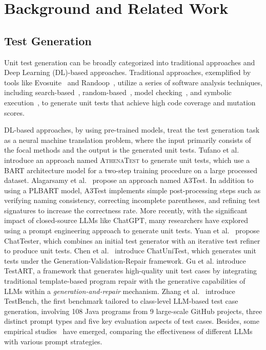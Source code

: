 \sloppy
\section{Background and Related Work}
\label{sec:background}

\subsection{Test Generation}

Unit test generation can be broadly categorized into traditional approaches and Deep Learning (DL)-based approaches. 
Traditional approaches, exemplified by tools like Evosuite~\cite{fraser_evosuite_2011} and Randoop~\cite{pacheco_randoop_2007}, utilize a series of software analysis techniques, including search-based~\cite{fraser_evosuite_2011}, random-based~\cite{pacheco_randoop_2007}, model checking~\cite{enoiu_automated_2016, gargantini_using_1999}, and symbolic execution~\cite{pasareanu_combining_2008,xie_symstra_2005}, to generate unit tests that achieve high code coverage and mutation scores.

DL-based approaches, by using pre-trained models, treat the test generation task as a neural machine translation problem, where the input primarily consists of the focal methods and the output is the generated unit tests. 
Tufano et al.~\cite{tufano_unit_2021} introduce an approach named \textsc{AthenaTest} to generate unit tests, which use a BART architecture model for a two-step training procedure on a large processed dataset. Alagarsamy et al.~\cite{alagarsamy_a3test_2023} propose an approach named A3Test. In addition to using a PLBART model, A3Test implements simple post-processing steps such as verifying naming consistency, correcting incomplete parentheses, and refining test signatures to increase the correctness rate.
More recently, with the significant impact of closed-source LLMs like ChatGPT, many researchers have explored using a prompt engineering approach to generate unit tests. Yuan et al.~\cite{yuan_no_2024} propose ChatTester, which combines an initial test generator with an iterative test refiner to produce unit tests. Chen et al.~\cite{chen_chatunitest_2024} introduce ChatUniTest, which generates unit tests under the Generation-Validation-Repair framework. 
Gu et al.\cite{gu2024testart} introduce TestART, a framework that generates high-quality unit test cases by integrating traditional template-based program repair\cite{zhang2023gamma} with the generative capabilities of LLMs within a \textit{generation-and-repair} mechanism.
Zhang et al.~\cite{zhang2024testbench} introduce TestBench, the first benchmark tailored to class-level LLM-based test case generation, involving 108 Java programs from 9 large-scale GitHub projects, three distinct prompt types and five key evaluation aspects of test cases.
Besides, some empirical studies~\cite{yang_empirical_2024, schaefer_empirical_2024} have emerged, comparing the effectiveness of different LLMs with various prompt strategies.







